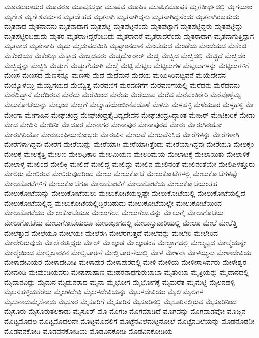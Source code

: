 {ಮೂವರುರಾಯರ
ಮೂವರೂ
ಮೂಷಕಸ್ತಥಾ
ಮೂಷವ
ಮೂಷಿಕ
ಮೂಷಿಕಮೂಷಕ
ಮೃಗತೀರ್ಥದಲ್ಲಿ
ಮೃಗಯಾಂ
ಮೃಗೇಶ
ಮೃಗೇಶವರ್ಮನ
ಮೃತದೇಹದ
ಮೃತನಾಗಿ
ಮೃತನಾಗಿದ್ದನು
ಮೃತನಾಗಿದ್ದನೆಂದು
ಮೃತನಾಗಿರಬಹುದು
ಮೃತನಾದ
ಮೃತನಾದನು
ಮೃತನಾದಾಗ
ಮೃತಪಟ್ಟ
ಮೃತಪಟ್ಟನೆಂದು
ಮೃತಪಟ್ಟಾಗ
ಮೃತಪಟ್ಟಿದ್ದರು
ಮೃತಪಟ್ಟಿದ್ದು
ಮೃತಪಟ್ಟಿರಬಹುದು
ಮೃತರ
ಮೃತರಾಗಿದ್ದರೆಂಬುದು
ಮೃತರಾದರೆ
ಮೃತರಾದರೆಂದು
ಮೃತರಾದಾಗ
ಮೃತವಾಗುತ್ತಿದ್ದಾಗ
ಮೃತವಾದ
ಮೃತೇನಾಪಿ
ಮೃದು
ಮೃದುಪದಮಿತಿ
ಮೃಷ್ಟಾಂನದಾನ
ಮೆಂಟೆಯದ
ಮೆಂಡೆಯ
ಮೆಂಡೆಯದ
ಮೆಕೆಂಜಿ
ಮೆಕೆಂಜಿಯು
ಮೆಕೆಂಝಿ
ಮೆಕ್ಕಾದ
ಮೆಚ್ಚದವರು
ಮೆಚ್ಚದೋರಾರ್
ಮೆಚ್ಚಿ
ಮೆಚ್ಚಿದ
ಮೆಚ್ಚಿದಲ್ಲಿ
ಮೆಚ್ಚಿದೆ
ಮೆಚ್ಚಿದೆಂ
ಮೆಚ್ಚಿದ್ದನ್ನು
ಮೆಚ್ಚಿಸಿ
ಮೆಚ್ಚುಗೆ
ಮೆಚ್ಚುಗೆಯಾಗಿ
ಮೆಚ್ಚೆ
ಮೆಟ್ಟಿ
ಮೆಟ್ಟಿಲ
ಮೆಟ್ಟಿಲುಗಳ
ಮೆಟ್ಟಿಲುಗಳನ್ನು
ಮೆಟ್ಟಿಲುಗಳಿಗೆ
ಮೆಣಸ
ಮೆಣಸದ
ಮೆಣಸನ್ನೂ
ಮೆಣಸು
ಮೆದೆ
ಮೆದೆಮನೆ
ಮೆದೆಯ
ಮೆಯಿಸಿರಿವಟ್ಟವನೆ
ಮೆಯೆದೇವನ
ಮೆಯ್ಯೊಳೆಯ್ದಿ
ಮೆಯ್ವಗೆಯದ
ಮೆಯ್ವೆತ್ತ
ಮೆರವಣಿಗೆ
ಮೆರವಣಿಗೆಗೆ
ಮೆರವಣಿಗೆಯಲ್ಲಿ
ಮೆರೆದನು
ಮೆರೆದವನು
ಮೆರೆದಿದ್ದಾನೆ
ಮೆರೆದಿರುವ
ಮೆರೆದು
ಮೆರೆಮಿಂಡ
ಮೆರೆಯ
ಮೆರೆಯುವ
ಮೆರೆವ
ಮೆರೆವಂತಿರೇರಿ
ಮೆರೆವೊಳ್ಳೆಮ್ಬ
ಮೆಲುಕೋಟೆಯನ್ನು
ಮೆಲ್ಕಂಡ
ಮೆಲ್ಲಗೆ
ಮೆಲ್ವಾಹೆಯೆಂಬೀನೆವದೊಳೆ
ಮೆಳಸು
ಮೆಳಹಳ್ಳಿ
ಮೆಳೆಯೂರ
ಮೆಳ್ಳಹಳ್ಳಿ
ಮೇ
ಮೇಂಗಾ
ಮೇಗಾಹಿನ
ಮೇಘಚಂದ್ರ
ಮೇಘಚಂದ್ರತ್ರೈವಿದ್ಯದೇವನ
ಮೇಘಚಂದ್ರಸಿದ್ಧಾಂತ
ಮೇಜರ್
ಮೇಟಿಕುರಿಕೆ
ಮೇಡು
ಮೇದ
ಮೇದಿನಿ
ಮೇದಿನೀ
ಮೇದೂರ
ಮೇನಾಗರ
ಮೇನಾಪುರ
ಮೇನಾಪುರದ
ಮೇರು
ಮೇರುಗಿರಯೋ
ಮೇರುಗಿರಿಯೋ
ಮೇರುಲಂಘಿಯಶೋಭರಃ
ಮೇರುವಿನ
ಮೇರುವೆ
ಮೇರುವೆನಿಸಿದ
ಮೇರೆಗಳನ್ನು
ಮೇರೆಗಳಾಗಿ
ಮೇರೆಗಳಾಗಿದ್ದವು
ಮೇರೆಗೆ
ಮೇರೆಯನ್ನು
ಮೇರೆಯಾಗಿ
ಮೇರೆಯಾಗಿತ್ತೆಂದು
ಮೇರೆಯಾಗಿದ್ದವು
ಮೇರೆಯೂ
ಮೇಲಕ್ಕಂ
ಮೇಲಕ್ಕೆ
ಮೇಲಕ್ಕೆತ್ತಿ
ಮೇಲಣ
ಮೇಲಧಿಕಾರಿ
ಮೇಲಮಿಯಣ
ಮೇಲರಿಮೆಯ
ಮೇಲಾಟಕ್ಕೆ
ಮೇಲಾಯಿತು
ಮೇಲಾಳಿಕೆ
ಮೇಲಾಳ್ಕೆ
ಮೇಲಿಂದ
ಮೇಲಿಕ್ಕಿ
ಮೇಲಿದೆ
ಮೇಲಿದ್ದ
ಮೇಲಿದ್ದು
ಮೇಲಿನ
ಮೇಲಿನಂತೆ
ಮೇಲಿನಂತೆಯೇ
ಮೇಲಿಪಿಳತ್ತೂರು
ಮೇಲಿರು
ಮೇಲಿರುವ
ಮೇಲಿರುವುದರಿಂದ
ಮೇಲು
ಮೇಲುಕೋಟೆ
ಮೇಲುಕೋಟೆಗಳಲ್ಲಿ
ಮೇಲುಕೋಟೆಗಳಷ್ಟೇ
ಮೇಲುಕೋಟೆಗಳಿಗೆ
ಮೇಲುಕೋಟೆಗೂ
ಮೇಲುಕೋಟೆಗೆ
ಮೇಲುಕೋಟೆಯ
ಮೇಲುಕೋಟೆಯಂತಹ
ಮೇಲುಕೋಟೆಯನ್ನು
ಮೇಲುಕೋಟೆಯಲು
ಮೇಲುಕೋಟೆಯಲ್ಲಷ್ಟೇ
ಮೇಲುಕೋಟೆಯಲ್ಲಿ
ಮೇಲುಕೋಟೆಯಲ್ಲಿದೆ
ಮೇಲುಕೋಟೆಯಲ್ಲಿದ್ದ
ಮೇಲುಕೋಟೆಯಲ್ಲಿದ್ದಿರಬಹುದು
ಮೇಲುಕೋಟೆಯಲ್ಲೇ
ಮೇಲುಕೋಟೆಯಿಂದ
ಮೇಲುಕೋಟೆಯು
ಮೇಲುಕೋಟೆಯೂ
ಮೇಲುಗೆಲಸ
ಮೇಲುಗೆಲಸವನ್ನು
ಮೇಲುಗೈ
ಮೇಲುಗೊಟೆಯ
ಮೇಲುಗೋಟೆಯ
ಮೇಲುಗೋಟೆಯಲೂ
ಮೇಲುಭಾಗದಲ್ಲಿ
ಮೇಲುಸ್ತುವಾರಿಯಲ್ಲಿ
ಮೇಲೂ
ಮೇಲೆ
ಮೇಲೆತ್ತಿ
ಮೇಲೆತ್ತುವ
ಮೇಲೆಯೂ
ಮೇಲೆಯೇ
ಮೇಲೆರಗಿ
ಮೇಲೆರಗುತ್ತದೆ
ಮೇಲೆವನ್ದು
ಮೇಲೇರಿ
ಮೇಲೇರಿದ
ಮೇಲೇರಿರುವುದು
ಮೇಲೇರುತ್ತಿದ್ದರು
ಮೇಲ್
ಮೇಲ್ಕಂಡ
ಮೇಲ್ಕಂಡಂತೆ
ಮೇಲ್ಬಾಗದಲ್ಲಿ
ಮೇಲ್ಮಟ್ಟದ
ಮೇಲ್ಮೆಯನ್ನೇ
ಮೇಲ್ಮೆಯಿಂದ
ಮೇಲ್ವಿಚಾರಕನ
ಮೇಲ್ವಿಚಾರಣೆ
ಮೇಲ್ವಿಚಾರಣೆಯಲ್ಲಿ
ಮೇಳ
ಮೇಳನಾ
ಮೇಳಯ್ಯನು
ಮೇಳಾದೇವಿಯ
ಮೇಳಾದೇವಿಯರ
ಮೇಳಾದೇವೀತಿ
ಮೇಳಾಪುರ
ಮೇಳಾಪುರದಲ್ಲಿ
ಮೇಳಿ
ಮೇಳಿಯ
ಮೇಳೀಸಾಸಿರ್ವರು
ಮೇಳೇಶ್ವರ
ಮೇವುಂಡಿ
ಮೇವುಂಡಿಯವರು
ಮೇಷಪಾಷಾಣ
ಮೇಹರನಾಥಗುರುಬಾಬಾ
ಮೈತುಂಬಾ
ಮೈತ್ರಿಯನ್ನು
ಮೈದಾನದಲ್ಲಿ
ಮೈದಾನವಿದ್ದು
ಮೈದುನ
ಮೈದುನರಾದ
ಮೈನಾ
ಮೈಭೋಗ
ಮೈಭೋಗಕ್ಕೆ
ಮೈಮರೆತ
ಮೈಮೆಟ್ಟಿ
ಮೈಲನಹಳ್ಳಿ
ಮೈಲನಹಳ್ಳಿಯಕೆರೆಯ
ಮೈಲಳದೇವಿ
ಮೈಲಳದೇವಿಯನ್ನು
ಮೈಲಳದೇವಿಯು
ಮೈಲಿ
ಮೈಲಿಗಳ
ಮೈಸುನಾಡುಮೈಸೆನಾಡು
ಮೈಸೂರ
ಮೈಸೂರಿಗೆ
ಮೈಸೂರಿನ
ಮೈಸೂರಿನಲ್ಲಿ
ಮೈಸೂರಿನಲ್ಲಿರುವ
ಮೈಸೂರಿನಿಂದ
ಮೈಸೂರು
ಮೈಸೂರುತಲಕಾಡು
ಮೈಸೂರ್
ಮೊ
ಮೊಗಚಿ
ಮೊಗಮಾಡಿದೆ
ಮೊಗವನ್ನು
ಮೊಗವಾಡವೋ
ಮೊಜ್ಜನ
ಮೊಟ್ಟಮೊದಲ
ಮೊಟ್ಟಮೊದಲನೇ
ಮೊಟ್ಟಮೊದಲಿಗೆ
ಮೊಟ್ಟೆನವಿಲೆಮಟ್ಟನೋಲೆ
ಮೊಟ್ಟೆನವಿಲೆಯನ್ನು
ಮೊಡನೊಡನೀ
ಮೊಡವನಕೋಡಿ
ಮೊಡವನಕೋಡಿಯ
ಮೊಡವಿನಕೋಡಿ
ಮೊಡವಿನಕೋಡಿಯ
}
